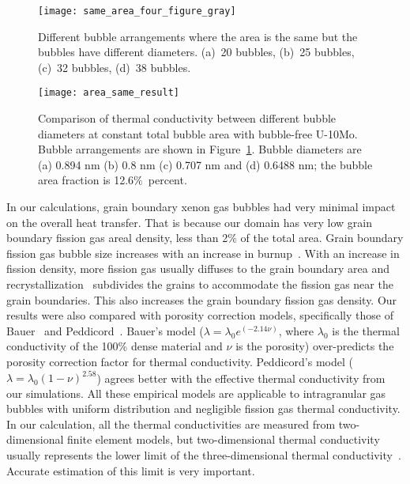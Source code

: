  
\begin{figure}
	\centering
	\texttt{[image: same\_area\_four\_figure\_gray]}
    \caption{Different bubble arrangements where the area is the same but the
      bubbles have different diameters. (a)~20 bubbles, (b)~25 bubbles,
      (c)~32 bubbles, (d)~38 bubbles.}
	\label{fig:area_same_four}
\end{figure}
\begin{figure}
	\centering
	\texttt{[image: area\_same\_result]}
	\caption[Comparison of effective thermal conductivity between different bubble 
      diameters at constant total bubble area with bubble-free U-10Mo.]{Comparison of thermal conductivity between different bubble 
      diameters at constant total bubble area with bubble-free U-10Mo. Bubble
      arrangements are shown in Figure~\ref{fig:area_same_four}.
      Bubble diameters are (a) 0.894 nm (b) 0.8 nm (c) 0.707 nm and (d) 0.6488 nm;
      the bubble area fraction is 12.6$\%$~percent.}
	\label{fig:four_results}
\end{figure}

In our calculations, grain boundary xenon gas bubbles had very minimal impact on the overall heat transfer. That is because our domain has very low grain boundary fission gas areal density, less than 2$\%$ of the total area. Grain boundary fission gas bubble size increases with an increase in burnup~\cite{kim2011fission}.
With an increase in fission density, more fission gas usually diffuses to the grain boundary area and recrystallization~\cite{kim2013recrystallization} subdivides the grains to accommodate the fission gas near the grain boundaries.
This also increases the grain boundary fission gas density. Our results were also compared with porosity correction models, specifically those of Bauer~\cite{bauer1995pile} and Peddicord~\cite{peddicord1978porosity}. Bauer's model ($\lambda=\lambda_0 e^{(-2.14\nu)}$, where $\lambda_0$ is the thermal conductivity of the 100\% dense material and $\nu$ is the porosity) over-predicts the porosity correction factor for thermal conductivity. Peddicord's model ($\lambda=\lambda_0(1-\nu)^{2.58}$) agrees better with the effective thermal conductivity from our simulations. All these empirical models are applicable to intragranular gas bubbles with uniform distribution and negligible fission gas thermal conductivity. In our calculation, all the thermal conductivities are measured from two-dimensional finite element models, but two-dimensional thermal conductivity usually represents the lower limit of the three-dimensional thermal conductivity~\cite{bakker1995determination}. Accurate estimation of this limit is very important. 


